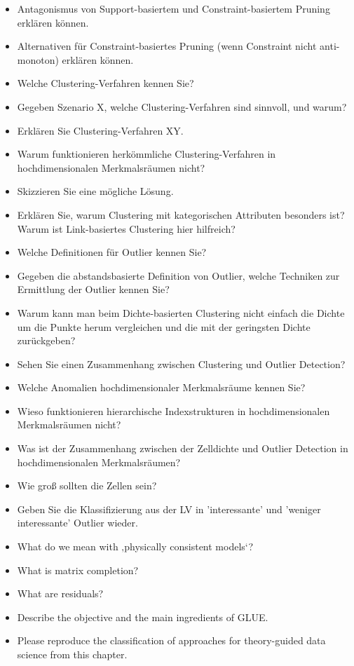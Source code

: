 \documentclass[paper=a4, fontsize=11pt]{scrartcl} %
\numberwithin{equation}{section} %
\numberwithin{figure}{section} %
\numberwithin{table}{section} %
\begin{document}
\begin{itemize}
\item Antagonismus von Support-basiertem und Constraint-basiertem Pruning erklären können.
\item Alternativen für Constraint-basiertes Pruning (wenn Constraint nicht anti-monoton) erklären können.
\item Welche Clustering-Verfahren kennen Sie?
\item Gegeben Szenario X, welche Clustering-Verfahren sind sinnvoll, und warum?
\item Erklären Sie Clustering-Verfahren XY.
\item Warum funktionieren herkömmliche Clustering-Verfahren in hochdimensionalen Merkmalsräumen nicht?
\item Skizzieren Sie eine mögliche Lösung.
\item Erklären Sie, warum Clustering mit kategorischen Attributen besonders ist? Warum ist Link-basiertes Clustering hier hilfreich?
\item Welche Definitionen für Outlier kennen Sie?
\item Gegeben die abstandsbasierte Definition von Outlier, welche Techniken zur Ermittlung der Outlier kennen Sie?
\item Warum kann man beim Dichte-basierten Clustering nicht einfach die Dichte um die Punkte herum vergleichen und die mit der geringsten Dichte zurückgeben?
\item Sehen Sie einen Zusammenhang zwischen Clustering und Outlier Detection?
\item Welche Anomalien hochdimensionaler Merkmalsräume kennen Sie?
\item Wieso funktionieren hierarchische Indexstrukturen in hochdimensionalen Merkmalsräumen nicht?
\item Was ist der Zusammenhang zwischen der Zelldichte und Outlier Detection in hochdimensionalen Merkmalsräumen?
\item Wie groß sollten die Zellen sein?
\item Geben Sie die Klassifizierung aus der LV in 'interessante' und 'weniger interessante' Outlier wieder.
\item What do we mean with ‚physically consistent models‘?
\item What is matrix completion?
\item What are residuals?
\item Describe the objective and the main ingredients of GLUE.
\item Please reproduce the classification of approaches for theory-guided data science from this chapter.
\end{itemize}
\end{document}
